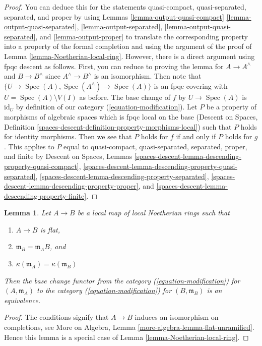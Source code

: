 \documentclass{stacks-project}
\theoremstyle{plain}
\newtheorem{lemma}[subsection]{Lemma}
\theoremstyle{definition}
\theoremstyle{remark}
\numberwithin{equation}{subsection}
\def\Spec{\mathop{\mathrm{Spec}}}
\begin{document}
\begin{proof}
You can deduce this for the statements
quasi-compact, quasi-separated, separated, and proper
by using Lemmas \ref{lemma-output-quasi-compact}
\ref{lemma-output-quasi-separated},
\ref{lemma-output-separated},
\ref{lemma-output-quasi-separated}, and
\ref{lemma-output-proper}
to translate the corresponding property into a property
of the formal completion and using the argument of the proof
of Lemma \ref{lemma-Noetherian-local-ring}.
However, there is a direct argument using fpqc descent as follows.
First, you can reduce to proving the lemma for $A \to A^\wedge$
and $B \to B^\wedge$ since $A^\wedge  \to B^\wedge$ is an isomorphism.
Then note that $\{U \to \Spec(A), \Spec(A^\wedge) \to \Spec(A)\}$ is an
fpqc covering with $U = \Spec(A) \setminus V(I)$ as before.
The base change of $f$ by $U \to \Spec(A)$ is $\text{id}_U$
by definition of our category (\ref{equation-modification}).
Let $P$ be a property of morphisms of algebraic spaces which
is fpqc local on the base (Descent on Spaces, Definition
\ref{spaces-descent-definition-property-morphisms-local})
such that $P$ holds for identity morphisms.
Then we see that $P$ holds for $f$ if and only if $P$ holds for $g$.
This applies to $P$ equal to
quasi-compact, quasi-separated, separated, proper, and finite
by
Descent on Spaces, Lemmas
\ref{spaces-descent-lemma-descending-property-quasi-compact},
\ref{spaces-descent-lemma-descending-property-quasi-separated},
\ref{spaces-descent-lemma-descending-property-separated},
\ref{spaces-descent-lemma-descending-property-proper}, and
\ref{spaces-descent-lemma-descending-property-finite}.
\end{proof}

\begin{lemma}
\label{lemma-equivalence-to-completion}
Let $A \to B$ be a local map of local Noetherian rings such that
\begin{enumerate}
\item $A \to B$ is flat,
\item $\mathfrak m_B = \mathfrak m_A B$, and
\item $\kappa(\mathfrak m_A) = \kappa(\mathfrak m_B)$
\end{enumerate}
Then the base change functor from the category
(\ref{equation-modification}) for $(A, \mathfrak m_A)$ to the category
(\ref{equation-modification}) for $(B, \mathfrak m_B)$
is an equivalence.
\end{lemma}

\begin{proof}
The conditions signify that $A \to B$ induces an isomorphism on
completions, see
More on Algebra, Lemma \ref{more-algebra-lemma-flat-unramified}.
Hence this lemma is a special case of
Lemma \ref{lemma-Noetherian-local-ring}.
\end{proof}
\end{document}
